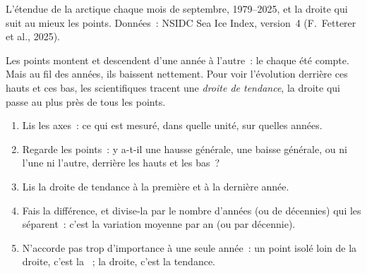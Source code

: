 \begin{omfigure}

{\small L'étendue de la  arctique chaque mois de septembre,
1979--2025, et la droite qui suit au mieux les points. Données~: NSIDC Sea
Ice Index, version~4 (F.~Fetterer et al., 2025).}
\label{fig:g8:ice-on-earth:sea-ice}
\end{omfigure}

Les points montent et descendent d'une année à l'autre~: le  chaque été compte. Mais au fil des années, ils baissent nettement.
Pour voir l'évolution derrière ces hauts et ces bas, les scientifiques
tracent une \emph{droite de tendance}, la droite qui passe au plus près
de tous les points.

\begin{method}
\begin{enumerate}
  \item Lis les axes~: ce qui est mesuré, dans quelle unité, sur quelles
        années.
  \item Regarde les points~: y a-t-il une hausse générale, une baisse
        générale, ou ni l'une ni l'autre, derrière les hauts et les bas~?
  \item Lis la droite de tendance à la première et à la dernière année.
  \item Fais la différence, et divise-la par le nombre d'années (ou de
        décennies) qui les séparent~: c'est la variation moyenne par an
        (ou par décennie).
  \item N'accorde pas trop d'importance à une seule année~: un point isolé
        loin de la droite, c'est la ~; la droite, c'est la tendance.
\end{enumerate}
\end{method}

